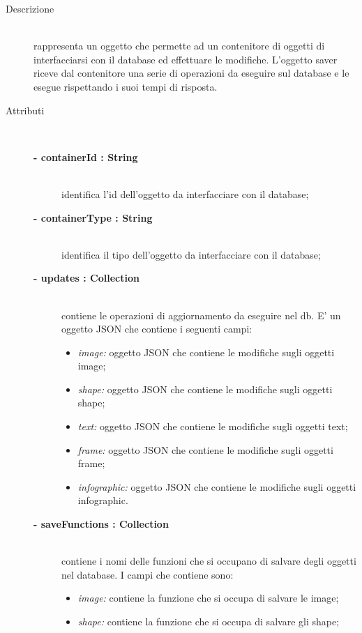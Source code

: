 \begin{description}
\item[Descrizione] \hfill \\
	rappresenta un oggetto che permette ad un contenitore di oggetti di interfacciarsi con il database ed effettuare le modifiche. L'oggetto saver riceve dal contenitore una serie di operazioni da eseguire sul database e le esegue rispettando i suoi tempi di risposta.
	
	
\item[Attributi] \hfill \\
	\begin{description}
		\item[\textbf{- containerId : String			}] \hfill \\
			identifica l'id dell'oggetto da interfacciare con il database;
		\item[\textbf{- containerType : String			}] \hfill \\
			identifica il tipo dell'oggetto da interfacciare con il database;
		\item[\textbf{- updates : Collection			}] \hfill \\
			contiene le operazioni di aggiornamento da eseguire nel db. E' un oggetto JSON che contiene i seguenti campi:
			\begin{itemize}
				\item \textit{image:} oggetto JSON che contiene le modifiche sugli oggetti image;
				\item \textit{shape:} oggetto JSON che contiene le modifiche sugli oggetti shape;
				\item \textit{text:} oggetto JSON che contiene le modifiche sugli oggetti text;
				\item \textit{frame:} oggetto JSON che contiene le modifiche sugli oggetti frame;
				\item \textit{infographic:} oggetto JSON che contiene le modifiche sugli oggetti infographic.
			\end{itemize}
		\item[\textbf{- saveFunctions : Collection			}] \hfill \\
			contiene i nomi delle funzioni che si occupano di salvare degli oggetti nel database. I campi che contiene sono:
			\begin{itemize}
				\item \textit{image:} contiene la funzione che si occupa di salvare le image;
				\item \textit{shape:} contiene la funzione che si occupa di salvare gli shape;

\end{itemize}
\end{description}
\end{description}
